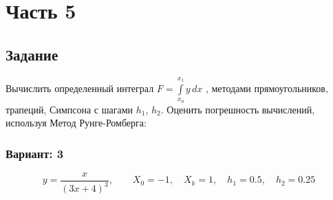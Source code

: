 \chapter*{Часть 5}

\section*{Задание}
Вычислить определенный интеграл
$F = \int\limits_{x_0}^{x_1}y\,dx$ , методами прямоугольников,
трапеций, Симпсона с шагами  $h_1$, $h_2$. Оценить погрешность вычислений,
используя Метод Рунге-Ромберга:

\subsection*{Вариант: 3}

$$y = \frac{x}{(3x+4)^3}, \qquad X_0 = -1,
\quad X_k=1, \quad h_1=0.5, \quad h_2=0.25$$

\pagebreak